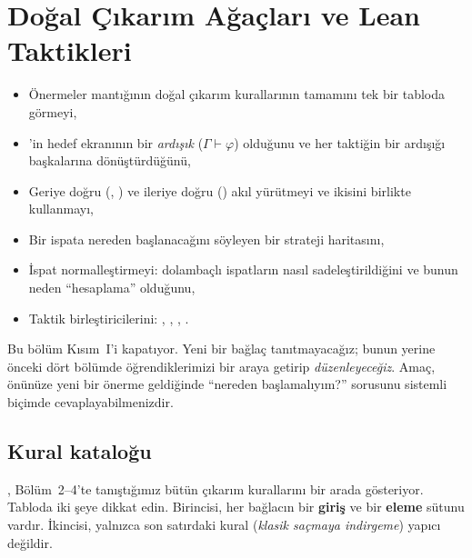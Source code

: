 \chapter{Doğal Çıkarım Ağaçları ve Lean Taktikleri}\label{bol:dogal-cikarim}

\begin{bolumhedefleri}
\begin{itemize}
  \item Önermeler mantığının doğal çıkarım kurallarının tamamını tek bir
        tabloda görmeyi,
  \item \Lean{}'in hedef ekranının bir \emph{ardışık} ($\Gamma \vdash \varphi$)
        olduğunu ve her taktiğin bir ardışığı başkalarına dönüştürdüğünü,
  \item Geriye doğru (, ) ve ileriye doğru
        () akıl yürütmeyi ve ikisini birlikte kullanmayı,
  \item Bir ispata nereden başlanacağını söyleyen bir strateji haritasını,
  \item İspat normalleştirmeyi: dolambaçlı ispatların nasıl
        sadeleştirildiğini ve bunun neden ``hesaplama'' olduğunu,
  \item Taktik birleştiricilerini: \lc{<;>}, ,
        , .
\end{itemize}
\end{bolumhedefleri}

Bu bölüm Kısım~I'i kapatıyor. Yeni bir bağlaç tanıtmayacağız; bunun
yerine önceki dört bölümde öğrendiklerimizi bir araya getirip
\emph{düzenleyeceğiz}. Amaç, önünüze yeni bir önerme geldiğinde
``nereden başlamalıyım?'' sorusunu sistemli biçimde cevaplayabilmenizdir.

\section{Kural kataloğu}\label{sec:kural-katalogu}

, Bölüm~2--4'te tanıştığımız bütün çıkarım
kurallarını bir arada gösteriyor. Tabloda iki şeye dikkat edin.
Birincisi, her bağlacın bir \textcolor{ikincil}{\bfseries giriş} ve bir
\textcolor{vurgu}{\bfseries eleme} sütunu vardır. İkincisi, yalnızca son
satırdaki kural (\emph{klasik saçmaya indirgeme}) yapıcı değildir.

